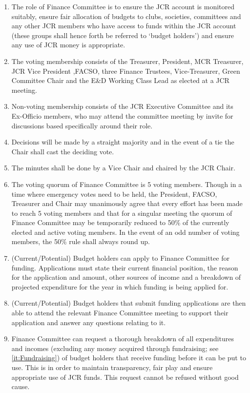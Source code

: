 \begin{enumerate}
    \item The role of Finance Committee is to ensure the JCR account is monitored suitably, ensure fair allocation of budgets to clubs, societies, committees and any other JCR members who have access to funds within the JCR account (these groups shall hence forth be referred to ‘budget holders’) and ensure any use of JCR money is appropriate.
    \item The voting membership consists of the Treasurer, President, MCR Treasurer, JCR Vice President ,FACSO, three Finance Trustees, Vice-Treasurer, Green Committee Chair and the E\&D Working Class Lead as elected at a JCR meeting.
    \item Non-voting membership consists of the JCR Executive Committee and its Ex-Officio members, who may attend the committee meeting by invite for discussions based specifically around their role.
    \item Decisions will be made by a straight majority and in the event of a tie the Chair shall cast the deciding vote.
    \item The minutes shall be done by a Vice Chair and chaired by the JCR Chair.
    \item The voting quorum of Finance Committee is 5 voting members. Though in a time where emergency votes need to be held, the President, FACSO, Treasurer and Chair may unanimously agree that every effort has been made to reach 5 voting members and that for a singular meeting the quorum of Finance Committee may be temporarily reduced to 50\% of the currently elected and active voting members. In the event of an odd number of voting members, the 50\% rule shall always round up.
    \item (Current/Potential) Budget holders can apply to Finance Committee for funding. Applications must state their current financial position, the reason for the application and amount, other sources of income and a breakdown of projected expenditure for the year in which funding is being applied for.
    \item (Current/Potential) Budget holders that submit funding applications are then able to attend the relevant Finance Committee meeting to support their application and answer any questions relating to it.
    \item Finance Committee can request a thorough breakdown of all expenditures and incomes (excluding any money acquired through fundraising; see \ref{it:Fundraising}) of budget holders that receive funding before it can be put to use. This is in order to maintain transparency, fair play and ensure appropriate use of JCR funds. This request cannot be refused without good cause.

\end{enumerate}
